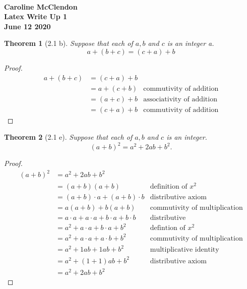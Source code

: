 \documentclass[12pt,std, fleqn]{article}
\newtheorem{theorem} {Theorem}
\begin{document}
\
\begin{center}
\textbf{Caroline McClendon} \\
\vspace{.6 cm}
\textbf{Latex Write Up 1} \\
\textbf{June 12 2020}
\end{center}
\vspace{.2 cm}


\begin{theorem}[2.1 b]
Suppose that each of $ a, b$ and $c$ is an integer
a. $$a + (b + c) = (c + a) + b$$
\end{theorem} 

\begin{proof}
\begin{align*}
a + (b + c)&=(c + a) + b & \\
       &=a + (c + b) & \text{commutivity of addition}\\
       &=(a + c) + b & \text{associativity of addition}\\
       &=(c + a) + b & \text{commutivity of addition}
\end{align*}
\end{proof}
     
\begin{theorem}[2.1 e] Suppose that each of $a, b$ and $c$ is an integer.
$$(a+b)^2 = a^2 + 2ab + b^2.$$
\end{theorem}

\begin{proof} 
\begin{align*}
(a+b)^2 &= a^2 + 2ab + b^2 \\
        &= (a+b)(a+b)  & \text{definition of $x^2$}\\
        &= (a+b) \cdot a + (a+b) \cdot b & \text{distributive axiom} \\
        &= a(a+b) + b(a+b) & \text{commutivity of multiplication} \\
        &= a\cdot a + a\cdot a + b \cdot a + b \cdot b & \text{distributive}\\
        &= a^2 + a\cdot a + b \cdot a + b^2 & \text{defintion of $x^2$} \\
        &= a^2 + a\cdot a + a \cdot b + b^2 & \text{commutivity of multiplication}\\
        &= a^2 + 1ab + 1ab + b^2 &\text{multiplicative identity}\\
        &= a^2 + (1+1)ab + b^2 & \text{distributive axiom}\\
        &= a^2 + 2ab + b^2 
\end{align*}
\end{proof}
\pagebreak
\end{document}
